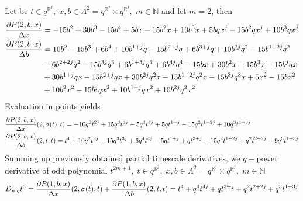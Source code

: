\begin{examp}
    \label{time_scale_pure_quantum_power_example_2}
    Let be $t\in q^{\mathbb{R}^j}, \; x,b\in\Lambda^2 = q^{\mathbb{R}^j} \times q^{\mathbb{R}^j}, \; m\in\mathbb{N}$ and let $m=2$, then
    \begin{align*}
        \frac{\partial P ( 2, b, x )}{\Delta x}
        &= -15 b^2 + 30 b^3 - 15 b^4 + 5 b x - 15 b^2 x + 10 b^3 x + 5 b q x^j - 15 b^2 q x^j + 10 b^3 q x^j \\
        \frac{\partial P ( 2, b, x )}{\Delta b}
        &= 10 b^2 - 15 b^3 + 6 b^4 + 10 b^{1 + j} q - 15 b^{2 + j} q + 6 b^{3 + j} q + 10 b^{2 j} q^2 - 15 b^{1 + 2 j} q^2 \\
        &+ 6 b^{2 + 2 j} q^2 - 15 b^{3 j} q^3 + 6 b^{1 + 3 j} q^3 + 6 b^{4 j} q^4 - 15 b x + 30 b^2 x - 15 b^3 x - 15 b^j q x \\
        &+ 30 b^{1 + j} q x - 15 b^{2 + j} q x + 30 b^{2 j} q^2 x - 15 b^{1 + 2 j} q^2 x - 15 b^{3 j} q^3 x + 5 x^2 - 15 b x^2 \\
        &+ 10 b^2 x^2 - 15 b^j q x^2 + 10 b^{1 + j} q x^2 + 10 b^{2 j} q^2 x^2
    \end{align*}
    Evaluation in points yields
    \begin{align*}
        &\frac{\partial P ( 2, b, x )}{\Delta x} (2, \sigma(t), t)
        = -10 q^2 t^{2 j} + 15 q^3 t^{3 j} - 5 q^4 t^{4 j} + 5 q t^{1 + j} - 15 q^2 t^{1 + 2 j} + 10 q^3 t^{1 + 3 j} \\
        &\frac{\partial P ( 2, b, x )}{\Delta b} (2, t, t)
        = t^4 + 10 q^2 t^{2 j} - 15 q^3 t^{3 j} + 6 q^4 t^{4 j} - 5 q t^{1 + j} + q t^{3 + j} + 15 q^2 t^{1 + 2 j}
        + q^2 t^{2 + 2 j} - 9 q^3 t^{1 + 3 j}
    \end{align*}
    Summing up previously obtained partial timescale derivatives, we $q-$power derivative of odd polynomial
    $t^{2m+1}, \; t\in q^{\mathbb{R}^j}, \; x,b\in\Lambda^2 = q^{\mathbb{R}^j} \times q^{\mathbb{R}^j}, \; m\in\mathbb{N}$
    \begin{align*}
        D_{n,q} t^{5}
        = \frac{\partial P ( 1, b, x )}{\Delta x} (2, \sigma(t), t)
        + \frac{\partial P ( 1, b, x )}{\Delta b} (2, t, t)
        = t^4 + q^4 t^{4 j} + q t^{3 + j} + q^2 t^{2 + 2 j} + q^3 t^{1 + 3 j}
    \end{align*}
\end{examp}
